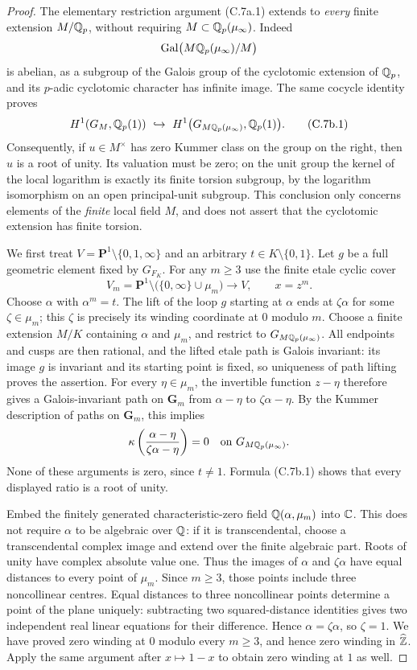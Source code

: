 \begin{proof}
The elementary restriction argument (C.7a.1) extends to \emph{every}
finite extension $M/\mathbb Q_p$, without requiring $M\subset\mathbb Q_p(\mu_\infty)$.
Indeed
\[
 \operatorname{Gal}\bigl(M\mathbb Q_p(\mu_\infty)/M\bigr)
\]
is abelian, as a subgroup of the Galois group of the cyclotomic extension
of $\mathbb Q_p$, and its $p$-adic cyclotomic character has infinite image.
The same cocycle identity proves
\[
 H^1(G_M,\mathbb Q_p(1))\ \hookrightarrow\
 H^1\bigl(G_{M\mathbb Q_p(\mu_\infty)},\mathbb Q_p(1)\bigr).               \tag{C.7b.1}
\]
Consequently, if $u\in M^\times$ has zero Kummer class on the group on
the right, then $u$ is a root of unity. Its valuation must be zero;
on the unit group the kernel of the local logarithm is exactly its finite
torsion subgroup, by the logarithm isomorphism on an open principal-unit
subgroup. This conclusion only concerns elements of the \emph{finite}
local field $M$, and does not assert that the cyclotomic extension has
finite torsion.

We first treat $V=\mathbf P^1\setminus\{0,1,\infty\}$ and an arbitrary
$t\in K\setminus\{0,1\}$. Let $g$ be a full geometric element fixed by
$G_{F_K}$. For any $m\ge3$ use the finite etale cyclic cover
\[
 V_m=\mathbf P^1\setminus\bigl(\{0,\infty\}\cup\mu_m\bigr)
       \longrightarrow V,\qquad x=z^m.
\]
Choose $\alpha$ with $\alpha^m=t$. The lift of the loop $g$ starting
at $\alpha$ ends at $\zeta\alpha$ for some $\zeta\in\mu_m$; this $\zeta$
is precisely its winding coordinate at $0$ modulo $m$. Choose a finite
extension $M/K$ containing $\alpha$ and $\mu_m$, and restrict to
$G_{M\mathbb Q_p(\mu_\infty)}$. All endpoints and cusps are then rational,
and the lifted etale path is Galois invariant: its image $g$ is invariant
and its starting point is fixed, so uniqueness of path lifting proves the
assertion. For every $\eta\in\mu_m$, the invertible function $z-\eta$
therefore gives a Galois-invariant path on $\mathbf G_m$ from
$\alpha-\eta$ to $\zeta\alpha-\eta$. By the Kummer description of
paths on $\mathbf G_m$, this implies
\[
 \kappa\left(\frac{\alpha-\eta}{\zeta\alpha-\eta}\right)=0
 \quad\hbox{on }G_{M\mathbb Q_p(\mu_\infty)}.
\]
None of these arguments is zero, since $t\ne1$. Formula (C.7b.1)
shows that every displayed ratio is a root of unity.

Embed the finitely generated characteristic-zero field
$\mathbb Q(\alpha,\mu_m)$ into $\mathbb C$. This does not require $\alpha$ to be
algebraic over $\mathbb Q$: if it is transcendental, choose a transcendental
complex image and extend over the finite algebraic part. Roots of unity
have complex absolute value one. Thus the images of $\alpha$ and
$\zeta\alpha$ have equal distances to every point of $\mu_m$. Since
$m\ge3$, those points include three noncollinear centres. Equal distances
to three noncollinear points determine a point of the plane uniquely:
subtracting two squared-distance identities gives two independent real
linear equations for their difference. Hence $\alpha=\zeta\alpha$,
so $\zeta=1$. We have proved zero winding at $0$ modulo every $m\ge3$,
and hence zero winding in $\widehat{\mathbb Z}$. Apply the same argument after
$x\mapsto1-x$ to obtain zero winding at $1$ as well.


\end{proof}
